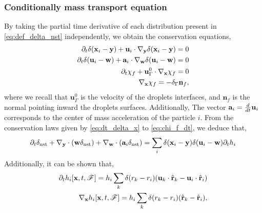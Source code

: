 \subsubsection{Conditionally mass transport equation}

By taking the partial time derivative of each distribution present in \ref{eq:def_delta_nst} independently, we obtain the conservation equations, 
\begin{align}
    \label{eq:dt_delta_x}
    \pddt \delta(\textbf{x}_i  - \textbf{y})
    +\textbf{u}_i  
    \cdot \pddy \delta(\textbf{x}_i  - \textbf{y})
    = 0\\
    \pddt \delta(\textbf{u}_i -\textbf{w})
    +\textbf{a}_i \cdot  \pddw   \delta(\textbf{u}_i  - \textbf{w})
    = 0\\
    \pddt \chi_f 
    + \textbf{u}_\Gamma^0 
    \cdot \pddx \chi_f = 0 \\
    \pddx \chi_f = - \delta_\Gamma \textbf{n}_f,
    \label{eq:chi_f_dt}
\end{align}
where we recall that $\textbf{u}_\Gamma^0$ is the velocity of the droplets interfaces, and $\textbf{n}_f$ is the normal pointing inward the droplets surfaces. 
Additionally, The vector $\textbf{a}_i = \frac{d}{dt} \textbf{u}_i$ corresponds to the center of mass acceleration of the particle $i$. 
From the conservation laws given by \ref{eq:dt_delta_x} to \ref{eq:chi_f_dt}, we deduce that, 
\begin{align}
    \partial_t \delta_\text{nst}
    + {\mathbf{\nabla}_\textbf{y}} \cdot (\textbf{w} \delta_\text{nst})
    + {\mathbf{\nabla}_\textbf{w}} \cdot (\textbf{a}_i  \delta_\text{nst})
    = 
    \sum_i \delta(\textbf{x}_i -\textbf{y}) \delta(\textbf{u}_i - \textbf{w}) \partial_t h_i
\end{align}
Additionally, it can be shown that,
\begin{align}
    \pddt  h_i[\textbf{x},t,\FF]
    = 
    h_i
    \sum_k 
    \delta(r_k - r_i)
    (\textbf{u}_k  \cdot \hat{\textbf{r}}_k - \textbf{u}_i  \cdot \hat{\textbf{r}}_i)\\
    \pddx  h_i[\textbf{x},t,\FF]
    = 
    h_i
    \sum_k 
    \delta(r_k - r_i)
    ( \hat{\textbf{r}}_k -  \hat{\textbf{r}}_i),
    \label{eq:dt_h_i}
\end{align}

